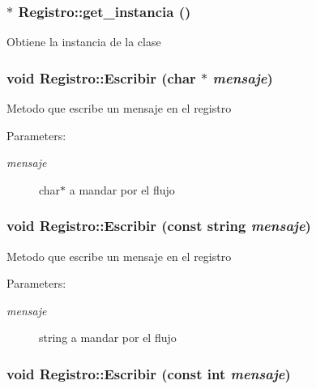 \subsubsection{ $\ast$ Registro::get\_\-instancia ()\hspace{0.3cm}{\tt  [static]}}\label{classRegistro_42d4db3fecc09bcde81e2cb71900a5c8}


Obtiene la instancia de la clase 
\subsubsection{\setlength{\rightskip}{0pt plus 5cm}void Registro::Escribir (char $\ast$ {\em mensaje})}\label{classRegistro_c1dc4d4b45b2a88ea6671e416d579add}


Metodo que escribe un mensaje en el registro \begin{Desc}
\item[Parameters:]
\begin{description}
\item[{\em mensaje}]char$\ast$ a mandar por el flujo \end{description}
\end{Desc}
\subsubsection{\setlength{\rightskip}{0pt plus 5cm}void Registro::Escribir (const string {\em mensaje})}\label{classRegistro_77370e6de3ea251fa2205de8bac6e2c5}


Metodo que escribe un mensaje en el registro \begin{Desc}
\item[Parameters:]
\begin{description}
\item[{\em mensaje}]string a mandar por el flujo \end{description}
\end{Desc}
\subsubsection{\setlength{\rightskip}{0pt plus 5cm}void Registro::Escribir (const int {\em mensaje})}\label{classRegistro_6d4fdee492751e8155111b2a11d8b429}


